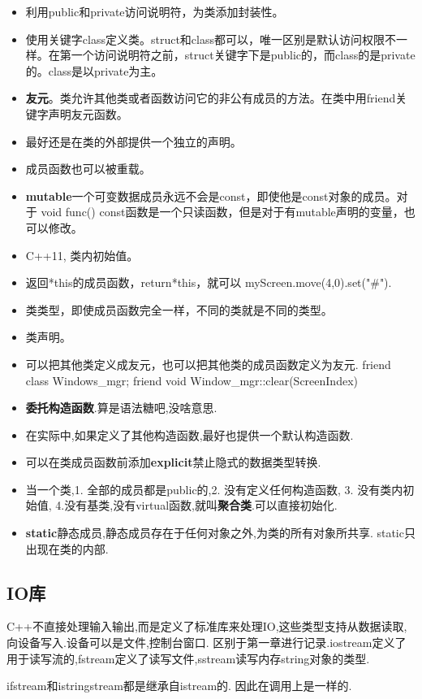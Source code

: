 \begin{itemize}
	\item 利用public和private访问说明符，为类添加封装性。
	\item 使用关键字class定义类。struct和class都可以，唯一区别是默认访问权限不一样。在第一个访问说明符之前，struct关键字下是public的，而class的是private的。class是以private为主。
	\item \textbf{友元}。类允许其他类或者函数访问它的非公有成员的方法。在类中用friend关键字声明友元函数。
	\item 最好还是在类的外部提供一个独立的声明。
	\item 成员函数也可以被重载。
	\item \textbf{mutable}一个可变数据成员永远不会是const，即使他是const对象的成员。对于 void func() const{}函数是一个只读函数，但是对于有mutable声明的变量，也可以修改。
	\item C++11, 类内初始值。
	\item 返回*this的成员函数，return*this，就可以 myScreen.move(4,0).set("\#").
	\item 类类型，即使成员函数完全一样，不同的类就是不同的类型。
	\item 类声明。
	\item 可以把其他类定义成友元，也可以把其他类的成员函数定义为友元. friend class Windows\_mgr; friend void Window\_mgr::clear(ScreenIndex)
	\item \textbf{委托构造函数}.算是语法糖吧,没啥意思.
	\item 在实际中,如果定义了其他构造函数,最好也提供一个默认构造函数.
	\item 可以在类成员函数前添加\textbf{explicit}禁止隐式的数据类型转换.
	\item 当一个类,1. 全部的成员都是public的,2. 没有定义任何构造函数, 3. 没有类内初始值, 4.没有基类,没有virtual函数,就叫\textbf{聚合类}.可以直接初始化.
	\item \textbf{static}静态成员,静态成员存在于任何对象之外,为类的所有对象所共享. static只出现在类的内部.
\end{itemize}

\subsection{IO库}
C++不直接处理输入输出,而是定义了标准库来处理IO,这些类型支持从数据读取,向设备写入.设备可以是文件,控制台窗口.
区别于第一章进行记录.iostream定义了用于读写流的,fstream定义了读写文件,sstream读写内存string对象的类型.

ifstream和istringstream都是继承自istream的. 因此在调用上是一样的.

